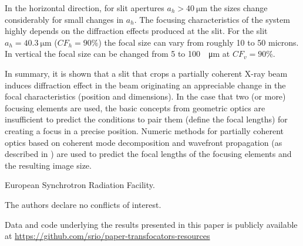 \documentclass{osa-article}
\begin{document}
In the horizontal direction, for slit apertures $a_h>\SI{40}{\micro\meter}$ the sizes change considerably for small changes in $a_h$. The focusing characteristics of the system highly depends on the diffraction effects produced at the slit. For the slit $a_h=\SI{40.3}{\micro\meter}$ ($CF_h=90\%$) the focal size can vary from roughly 10 to 50 microns. In vertical the focal size can be changed from 5 to 100~\SI{}{\micro\meter} at $CF_v=90\%$.

In summary, it is shown that a slit that crops a partially coherent X-ray beam induces diffraction effect in the beam originating an appreciable change in the focal characteristics (position and dimensions). In the case that two (or more) focusing elements are used, the basic concepts from geometric optics are insufficient to predict the conditions to pair them (define the focal lengths) for creating a focus in a precise position. Numeric methods for partially coherent optics based on coherent mode decomposition and wavefront propagation (as described in \cite{delrio2021pairing}) are used to predict the focal lengths of the focusing elements and the resulting image size.   




\begin{backmatter}
European Synchrotron Radiation Facility.


The authors declare no conflicts of interest.


Data and code underlying the results presented in this paper is publicly available at \url{https://github.com/srio/paper-transfocators-resources}



\end{backmatter}







\end{document}
